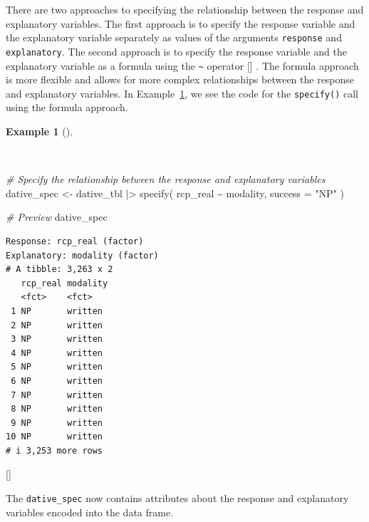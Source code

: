 \documentclass[
  letterpaper,
  krantz1]{latex/krantz-mod}
\newenvironment{Shaded}{\begin{snugshade}}{\end{snugshade}}
\newcommand{\AttributeTok}[1]{\textcolor[rgb]{0.00,0.00,0.00}{#1}}
\newcommand{\CommentTok}[1]{\textcolor[rgb]{0.00,0.00,0.00}{\textit{#1}}}
\newcommand{\FunctionTok}[1]{\textcolor[rgb]{0.00,0.00,0.00}{#1}}
\newcommand{\NormalTok}[1]{\textcolor[rgb]{0.00,0.00,0.00}{#1}}
\newcommand{\OtherTok}[1]{\textcolor[rgb]{0.00,0.00,0.00}{#1}}
\newcommand{\SpecialCharTok}[1]{\textcolor[rgb]{0.00,0.00,0.00}{#1}}
\newcommand{\StringTok}[1]{\textcolor[rgb]{0.00,0.00,0.00}{#1}}
\newcommand{\cindex}[1]{%
  \StrSubstitute{#1}{_}{\_}[\temp]%
  \index{\temp}%
}
\theoremstyle{definition}
\theoremstyle{definition}
\newtheorem{example}{Example}[chapter]
\theoremstyle{remark}
\begin{document}
There are two approaches to specifying the relationship between the
response and explanatory
variables. The first approach is to specify
the response variable and the explanatory variable separately as values
of the arguments \texttt{response} and \texttt{explanatory}. The second
approach is to specify the response variable and the explanatory
variable as a formula using the \texttt{\textasciitilde{}}
operator\cindex{\textasciitilde}. The formula approach is more flexible
and allows for more complex relationships between the response and
explanatory variables. In Example~\ref{exm-infer-cat-specify-bivariate},
we see the code for the \texttt{specify()} call using the formula
approach.

\begin{example}[]\protect\hypertarget{exm-infer-cat-specify-bivariate}{}\label{exm-infer-cat-specify-bivariate}

~

\begin{Shaded}
\begin{Highlighting}[numbers=left,,]
\CommentTok{\# Specify the relationship between the response and explanatory variables}
\NormalTok{dative\_spec }\OtherTok{\textless{}{-}}
\NormalTok{  dative\_tbl }\SpecialCharTok{|\textgreater{}}
  \FunctionTok{specify}\NormalTok{(}
\NormalTok{    rcp\_real }\SpecialCharTok{\textasciitilde{}}\NormalTok{ modality,}
    \AttributeTok{success =} \StringTok{"NP"}
\NormalTok{  )}

\CommentTok{\# Preview}
\NormalTok{dative\_spec}
\end{Highlighting}
\end{Shaded}

\begin{verbatim}
Response: rcp_real (factor)
Explanatory: modality (factor)
# A tibble: 3,263 x 2
   rcp_real modality
   <fct>    <fct>   
 1 NP       written 
 2 NP       written 
 3 NP       written 
 4 NP       written 
 5 NP       written 
 6 NP       written 
 7 NP       written 
 8 NP       written 
 9 NP       written 
10 NP       written 
# i 3,253 more rows
\end{verbatim}

 \cindex{specify()}

\end{example}

The \texttt{dative\_spec} now contains attributes about the response and
explanatory variables encoded into the data frame.
\end{document}
